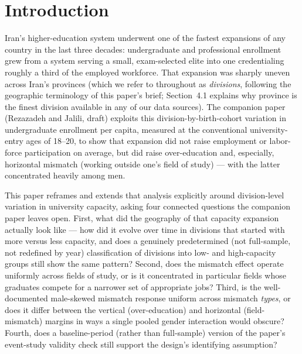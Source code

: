 \documentclass[11pt]{article}
\begin{document}
\begin{abstract}
a small share of the much larger extensive-margin (employment-rate) gap.

\vspace{6pt}
\noindent\textbf{JEL codes:} I23, I24, J16, J21, J24, O15, R23\\
\textbf{Keywords:} educational mismatch, over-education, horizontal mismatch, university expansion, regional/divisional variation, field of study, gender gap, selection into employment, Iran
\end{abstract}

\section{Introduction}

Iran's higher-education system underwent one of the fastest expansions of any country in the last three decades: undergraduate and professional enrollment grew from a system serving a small, exam-selected elite into one credentialing roughly a third of the employed workforce. That expansion was sharply uneven across Iran's provinces (which we refer to throughout as \emph{divisions}, following the geographic terminology of this paper's brief; Section~4.1 explains why province is the finest division available in any of our data sources). The companion paper (Rezazadeh and Jalili, draft) exploits this division-by-birth-cohort variation in undergraduate enrollment per capita, measured at the conventional university-entry ages of 18--20, to show that expansion did not raise employment or labor-force participation on average, but did raise over-education and, especially, horizontal mismatch (working outside one's field of study) --- with the latter concentrated heavily among men.

This paper reframes and extends that analysis explicitly around division-level variation in university capacity, asking four connected questions the companion paper leaves open. First, what did the geography of that capacity expansion actually look like --- how did it evolve over time in divisions that started with more versus less capacity, and does a genuinely predetermined (not full-sample, not redefined by year) classification of divisions into low- and high-capacity groups still show the same pattern? Second, does the mismatch effect operate uniformly across fields of study, or is it concentrated in particular fields whose graduates compete for a narrower set of appropriate jobs? Third, is the well-documented male-skewed mismatch response uniform across mismatch \emph{types}, or does it differ between the vertical (over-education) and horizontal (field-mismatch) margins in ways a single pooled gender interaction would obscure? Fourth, does a baseline-period (rather than full-sample) version of the paper's event-study validity check still support the design's identifying assumption?
\end{document}
